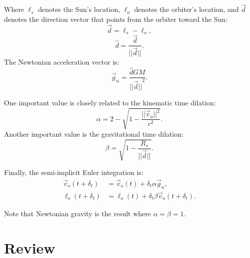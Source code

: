 \documentclass[12pt]{article}
\begin{document}
Where $\ell_s$ denotes the Sun's location, $\ell_o$ denotes the orbiter's location, and $\vec{d}$ denotes the direction vector that points from the orbiter toward the Sun:
\begin{equation}
\label{direction_vector}
\vec{d} = \ell_{s} - \ell_{o},	
\end{equation}
\begin{equation}
\label{direction_unit_vector}
\hat{d} = \frac{\vec{d}}{\lvert\lvert \vec{d} \rvert\rvert}.
\end{equation}
The Newtonian acceleration vector is:
\begin{equation}
\label{newton}
\vec{g}_n = \frac{\hat{d} G M}{{\lvert\lvert \vec{d} \rvert\rvert}^2}.
\end{equation}

One important value is closely related to the kinematic time dilation:
\begin{equation}
\label{eq_kinematic}
\alpha = 2 - \sqrt{1 - \frac{\lvert\lvert \vec{v}_{o}\rvert\rvert^2}{c^2}}.
\end{equation}
Another important value is the gravitational time dilation:
\begin{equation}
\label{eq_gravitational}
\beta = \sqrt{1 - \frac{R_{s}}{\lvert \lvert \vec{d} \rvert \rvert}}.
\end{equation}

Finally, the semi-implicit Euler integration is:
\begin{align}
\label{eq_velocity}
\vec{v}_{o}(t + \delta_t) &= \vec{v}_{o}(t) + \delta_{t} \alpha \vec{g}_n, \\
\label{eq_position}
\ell_{o}(t + \delta_t) &= \ell_{o}(t) + \delta_{t} \beta \vec{v}_{o}(t + \delta_t).
\end{align}

Note that Newtonian gravity is the result where $\alpha = \beta = 1$.





\section {Review}
\end{document}
